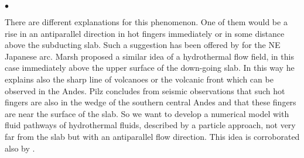 \documentclass[twoside,10pt]{article}
\newenvironment{dlist}
   {\begin{list}
      {$\bullet$}
      {
      \setlength{\topsep}{0.5ex}
      \setlength{\partopsep}{0.0ex}
      \setlength{\parsep}{0.5ex}
      \setlength{\itemsep}{0.0ex}
      \setlength{\itemindent}{3.0ex}
      \setlength{\leftmargin}{0.0ex}
      \setlength{\labelsep}{1.0ex}
      }
   }
   {\end{list}}
\begin{document}
\begin{dlist}
There are different explanations for this phenomenon. 
One of them would be a rise in an antiparallel direction in hot fingers immediately or in some distance above the subducting slab.
Such a suggestion has been offered by \cite{Tamura2002} for the NE Japanese arc.
Marsh \cite{Marsh2007} proposed a similar idea of a hydrothermal flow field, in this case immediately above the upper surface of the down-going slab.
In this way he explains also the sharp line of volcanoes or the volcanic front which can be observed in the Andes.
Pilz \cite{Pilz2008} concludes from seismic observations that such hot fingers are also in the wedge of the southern central Andes and that these fingers are near the surface of the slab.
So we want to develop a numerical model with fluid pathways of hydrothermal fluids, described by a particle approach, not very far from the slab but with an antiparallel flow direction.
This idea is corroborated also by \cite{Furukawa2009}.
\end{dlist}
\end{document}
